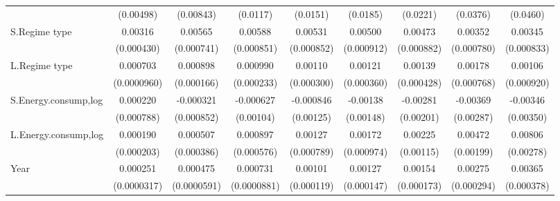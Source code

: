 \begin{table}[htbp]
\begin{tabular}{l*{8}{c}}
                    &   (0.00498)         &   (0.00843)         &    (0.0117)         &    (0.0151)         &    (0.0185)         &    (0.0221)         &    (0.0376)         &    (0.0460)         \\
[1em]
S.Regime type       &     0.00316\sym{***}&     0.00565\sym{***}&     0.00588\sym{***}&     0.00531\sym{***}&     0.00500\sym{***}&     0.00473\sym{***}&     0.00352\sym{***}&     0.00345\sym{***}\\
                    &  (0.000430)         &  (0.000741)         &  (0.000851)         &  (0.000852)         &  (0.000912)         &  (0.000882)         &  (0.000780)         &  (0.000833)         \\
[1em]
L.Regime type       &    0.000703\sym{***}&    0.000898\sym{***}&    0.000990\sym{***}&     0.00110\sym{***}&     0.00121\sym{***}&     0.00139\sym{***}&     0.00178\sym{**} &     0.00106         \\
                    & (0.0000960)         &  (0.000166)         &  (0.000233)         &  (0.000300)         &  (0.000360)         &  (0.000428)         &  (0.000768)         &  (0.000920)         \\
[1em]
S.Energy.consump,log&    0.000220         &   -0.000321         &   -0.000627         &   -0.000846         &    -0.00138         &    -0.00281         &    -0.00369         &    -0.00346         \\
                    &  (0.000788)         &  (0.000852)         &   (0.00104)         &   (0.00125)         &   (0.00148)         &   (0.00201)         &   (0.00287)         &   (0.00350)         \\
[1em]
L.Energy.consump,log&    0.000190         &    0.000507         &    0.000897         &     0.00127         &     0.00172\sym{*}  &     0.00225\sym{*}  &     0.00472\sym{**} &     0.00806\sym{***}\\
                    &  (0.000203)         &  (0.000386)         &  (0.000576)         &  (0.000789)         &  (0.000974)         &   (0.00115)         &   (0.00199)         &   (0.00278)         \\
[1em]
Year                &    0.000251\sym{***}&    0.000475\sym{***}&    0.000731\sym{***}&     0.00101\sym{***}&     0.00127\sym{***}&     0.00154\sym{***}&     0.00275\sym{***}&     0.00365\sym{***}\\
                    & (0.0000317)         & (0.0000591)         & (0.0000881)         &  (0.000119)         &  (0.000147)         &  (0.000173)         &  (0.000294)         &  (0.000378)         \\

\end{tabular}
\end{table}
